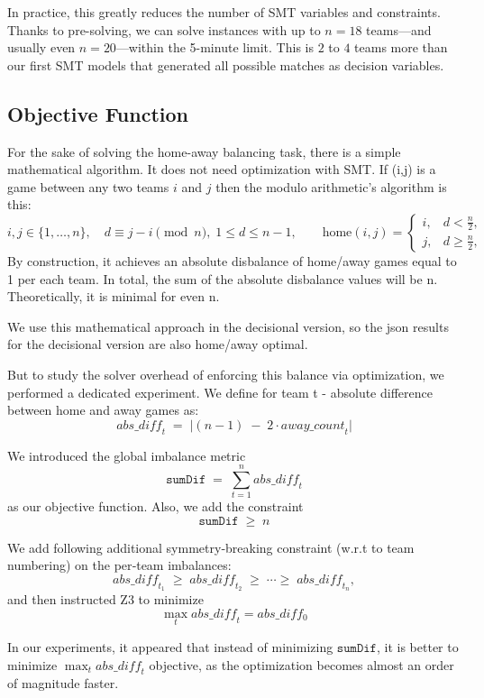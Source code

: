 In practice, this greatly reduces the number of SMT variables and constraints. Thanks to pre-solving, we can solve instances with up to $n=18$ teams—and usually even $n=20$—within the 5-minute limit. This is $2$ to $4$ teams more than our first SMT models that generated all possible matches as decision variables.

\subsection{Objective Function}

For the sake of solving the home-away balancing task, there is a simple mathematical algorithm. It does not need optimization with SMT.
If (i,j) is a game between any two teams $i$ and $j$ then the modulo arithmetic's algorithm is this:
\[
i,j\in\{1,\dots,n\},\quad
d\equiv j-i\pmod n,\;1\le d\le n-1,
\qquad
\text{home}(i,j)=
\begin{cases}
i,&d<\tfrac n2,\\
j,&d\ge\tfrac n2,
\end{cases}
\]
By construction, it achieves an absolute disbalance of home/away games equal to 1 per each team. In total, the sum of the absolute disbalance values will be n.
Theoretically, it is minimal for even n.

We use this mathematical approach in the decisional version, so the json results for the decisional version are also home/away optimal.

But to study the solver overhead of enforcing this balance via optimization, we performed a dedicated experiment. 
We define for team t - absolute difference between home and away games as:
\[
\mathit{abs\_diff}_t \;=\;\bigl\lvert (n-1)\;-\;2\cdot\mathit{away\_count}_t\bigr\rvert
\]

 We introduced the global imbalance metric
\[
\texttt{sumDif} \;=\;\sum_{t=1}^{n}\mathit{abs\_diff}_t
\]
as our objective function.  Also, we add the constraint
\[
\texttt{sumDif} \;\ge\; n
\]

We add following additional symmetry‑breaking constraint (w.r.t to team numbering) on the per‑team imbalances:
\[
\mathit{abs\_diff}_{t_1}\;\ge\;\mathit{abs\_diff}_{t_2}\;\ge\;\cdots\ge\;\mathit{abs\_diff}_{t_n},
\]
and then instructed Z3 to minimize
\[
\max_{t}\mathit{abs\_diff}_t = abs\_diff_{0}
\]

In our experiments, it appeared that instead of minimizing $\texttt{sumDif}$, it is better to minimize $\max_{t}\mathit{abs\_diff}_t$ objective, as the optimization becomes almost an order of magnitude faster.
